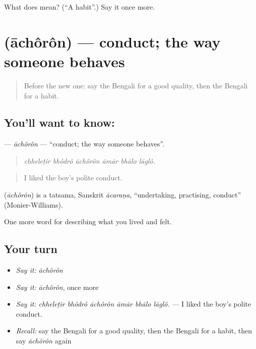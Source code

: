 \begin{tcolorbox}[breakable,colback=teal!4,colframe=teal!35!black,title={Before you move on}]
What does  mean? (\textquotedblleft{}A habit\textquotedblright{}.) Say it once more.
\end{tcolorbox}
\section[\texorpdfstring{\bn{আচরণ} (āchôrôn)}{আচরণ (āchôrôn)}]{ (āchôrôn) — conduct; the way someone behaves}

\label{lesson:BN-C456-achoron}



\begin{quote}
Before the new one: say the Bengali for a good quality, then the Bengali for a habit.
\end{quote}

\subsection*{You'll want to know: }
\textbf{} — \emph{āchôrôn} — \textquotedblleft{}conduct; the way someone behaves\textquotedblright{}.

\begin{quote}
     
\end{quote}

\begin{quote}
\emph{chheleṭir bhôdrô āchôrôn āmār bhālo lāglô.}
\end{quote}

\begin{quote}
I liked the boy's polite conduct.
\end{quote}

\begin{cousinweb}
\textbf{} (\emph{āchôrôn}) is a tatsama, Sanskrit \emph{ācaraṇa}, \textquotedblleft{}undertaking, practising, conduct\textquotedblright{} (Monier-Williams).
\end{cousinweb}

\begin{grammarlens}[title={What you've built}]
One more word for describing what you lived and felt.
\end{grammarlens}

\subsection*{Your turn}
\begin{itemize}
\raggedright
  \item \emph{Say it:} \emph{āchôrôn}
  \item \emph{Say it:} \emph{āchôrôn}, once more
  \item \emph{Say it:} \emph{chheleṭir bhôdrô āchôrôn āmār bhālo lāglô.} — I liked the boy's polite conduct.
  \item \emph{Recall:} say the Bengali for a good quality, then the Bengali for a habit, then say \emph{āchôrôn} again
\end{itemize}


